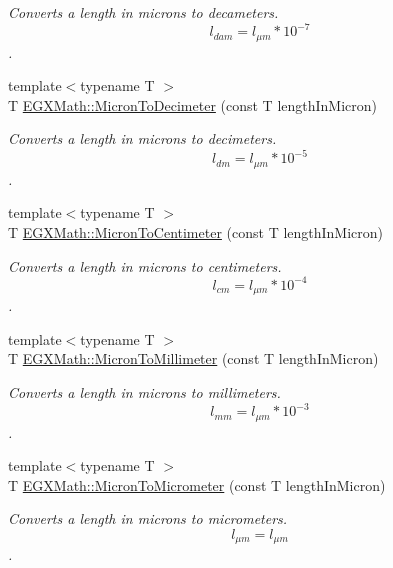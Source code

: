 \begin{DoxyCompactItemize}
\begin{DoxyCompactList}\small\item\em Converts a length in microns to decameters. \[ l_{dam}=l_{\mu m} * 10^{-7} \]. \end{DoxyCompactList}\item 
{\footnotesize template$<$typename T $>$ }\\T \mbox{\hyperlink{group___e_g_x_math-_conversions-_length_conversions-_non-_s_i-_micron-_s_i_gaac80fa1efc245cc204395a3a2771c2be}{E\+G\+X\+Math\+::\+Micron\+To\+Decimeter}} (const T length\+In\+Micron)
\begin{DoxyCompactList}\small\item\em Converts a length in microns to decimeters. \[ l_{dm}=l_{\mu m} * 10^{-5} \]. \end{DoxyCompactList}\item 
{\footnotesize template$<$typename T $>$ }\\T \mbox{\hyperlink{group___e_g_x_math-_conversions-_length_conversions-_non-_s_i-_micron-_s_i_gac987114703e1d7672646b3835f56d78b}{E\+G\+X\+Math\+::\+Micron\+To\+Centimeter}} (const T length\+In\+Micron)
\begin{DoxyCompactList}\small\item\em Converts a length in microns to centimeters. \[ l_{cm}=l_{\mu m} * 10^{-4} \]. \end{DoxyCompactList}\item 
{\footnotesize template$<$typename T $>$ }\\T \mbox{\hyperlink{group___e_g_x_math-_conversions-_length_conversions-_non-_s_i-_micron-_s_i_ga6dc810fc8f42b1a261023a8529eb68c3}{E\+G\+X\+Math\+::\+Micron\+To\+Millimeter}} (const T length\+In\+Micron)
\begin{DoxyCompactList}\small\item\em Converts a length in microns to millimeters. \[ l_{mm}=l_{\mu m} * 10^{-3} \]. \end{DoxyCompactList}\item 
{\footnotesize template$<$typename T $>$ }\\T \mbox{\hyperlink{group___e_g_x_math-_conversions-_length_conversions-_non-_s_i-_micron-_s_i_gaf65c3c52f13b30b32ae35c4b8edc30a8}{E\+G\+X\+Math\+::\+Micron\+To\+Micrometer}} (const T length\+In\+Micron)
\begin{DoxyCompactList}\small\item\em Converts a length in microns to micrometers. \[ l_{\mu m}=l_{\mu m} \]. \end{DoxyCompactList}\item 

\end{DoxyCompactItemize}
